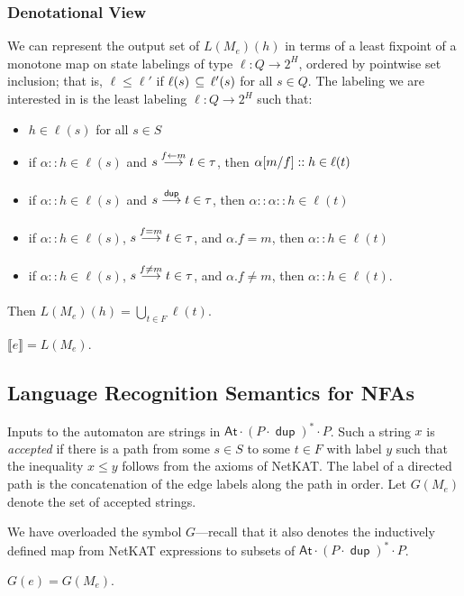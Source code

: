 \documentclass{article}
\newcommand\den[1]{\llbracket #1\rrbracket}
\newcommand\At{\ensuremath{\mathsf{At}}}
\newcommand\pdup{\mathop{\mathsf{dup}}}
\renewcommand\star{^{\textstyle *}}
\renewcommand\powerset[1]{2^{#1}}
\begin{document}
\subsubsection*{Denotational View}

We can represent the output set of $L(M_e)(h)$ in terms of a least fixpoint of a monotone map on state labelings of type $\ell:Q\to\powerset H$, ordered by pointwise set inclusion; that is, $\ell\leq\ell'$ if $\ell(s)\,\subseteq\,\ell'(s)$ for all $s\in Q$. The labeling we are interested in is the least labeling $\ell:Q\to\powerset H$ such that:
\begin{itemize}
\item
$h\in \ell(s)$ for all $s\in S$
\item
if $\alpha::h \in \ell(s)$ and $s\underset{}{\overset{f\leftarrow m}\longrightarrow}t\in\tau$, then $\alpha[m/f]::h \in \ell(t)$
\item
if $\alpha::h \in \ell(s)$ and $s\goesto{\pdup}{}t\in\tau$, then $\alpha::\alpha::h \in \ell(t)$
\item
if $\alpha::h \in \ell(s)$, $s\underset{}{\overset{f=m}\longrightarrow}t\in\tau$, and $\alpha.f=m$, then $\alpha::h \in \ell(t)$
\item
if $\alpha::h \in \ell(s)$, $s\underset{}{\overset{f\neq m}\longrightarrow}t\in\tau$, and $\alpha.f\neq m$, then $\alpha::h \in \ell(t)$.
\end{itemize}
Then $L(M_e)(h) = \bigcup_{t\in F}\ell(t)$.

\begin{theorem}
$\den e = L(M_e)$.
\end{theorem}

\subsection*{Language Recognition Semantics for NFAs}

Inputs to the automaton are strings in $\At\cdot(P\cdot\pdup)\star\cdot P$. Such a string $x$ is \emph{accepted} if there is a path from some $s\in S$ to some $t\in F$ with label $y$ such that the inequality $x\leq y$ follows from the axioms of NetKAT. The label of a directed path is the concatenation of the edge labels along the path in order. Let $G(M_e)$ denote the set of accepted strings.

We have overloaded the symbol $G$---recall that it also denotes the inductively defined map from NetKAT expressions to subsets of $\At\cdot(P\cdot\pdup)\star\cdot P$.

\begin{theorem}
$G(e) = G(M_e)$.
\end{theorem}
\end{document}
